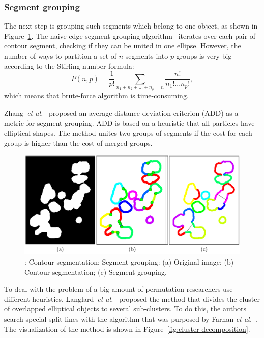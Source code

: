 \documentclass{lutmscthesis}[2010/09/22]
\begin{document}
\subsubsection{Segment grouping}
The next step is grouping such segments which belong to one object, as shown in Figure~\ref{fig:Segment-grouping}. 
The naive edge segment grouping algorithm~\cite{bubble} iterates over each pair of contour segment, checking if they can be united in one ellipse. However, the number of ways to partition a set of $n$ segments into $p$ groups is very big according to the Stirling number formula:
\begin{equation}
    P(n,p) = \frac{1}{p!}\sum_{n_1+n_2+...+n_p=n}\frac{n!}{n_1!...n_p!},
\end{equation}
which means that brute-force algorithm is time-consuming.

Zhang~\emph{et al.}~\cite{bubble} proposed an average distance deviation criterion (ADD) as a metric for segment grouping. ADD is based on a heuristic that all particles have elliptical shapes. The method unites two groups of segments if the cost for each group is higher than the cost of merged groups.
\begin{figure} [ht]
  \includegraphics[width=\linewidth, scale=0.5]{segment-grouping.png}
  \caption{: Contour segmentation: 
    Segment grouping: 
    (a) Original image; 
    (b) Contour segmentation;
    (c) Segment grouping.~\cite{Zafari15}}
  \label{fig:Segment-grouping}
\end{figure}


To deal with the problem of a big amount of permutation researchers use different heuristics. Langlard~\emph{et al.}~\cite{LANGLARD2018} proposed the method that divides the cluster of overlapped elliptical objects to several sub-clusters. To do this, the authors search special split lines with the algorithm that was purposed by Farhan \emph{et al.}~\cite{farhan}. The visualization of the method is shown in Figure~\ref{fig:cluster-decomposition}.
\end{document}

